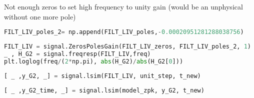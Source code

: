
\noindent Not enough zeros to set high frequency to unity gain (would be an unphysical without one more pole)

\begin{spacing}{1.2} \begin{lstlisting}[frame=single,language=Python]
FILT_LIV_poles_2= np.append(FILT_LIV_poles,-0.00020951281288038756)
\end{lstlisting} \end{spacing}

\begin{spacing}{1.2} \begin{lstlisting}[frame=single,language=Python]
FILT_LIV = signal.ZerosPolesGain(FILT_LIV_zeros, FILT_LIV_poles_2, 1)
_ , H_G2 = signal.freqresp(FILT_LIV,freq)
plt.loglog(freq/(2*np.pi), abs(H_G2)/abs(H_G2[0]))
\end{lstlisting} \end{spacing}


\begin{spacing}{1.2} \begin{lstlisting}[frame=single,language=Python]
[ _ ,y_G2, _] = signal.lsim(FILT_LIV, unit_step, t_new)
\end{lstlisting} \end{spacing}

\begin{spacing}{1.2} \begin{lstlisting}[frame=single,language=Python]
[ _ ,y_G2_time, _] = signal.lsim(model_zpk, y_G2, t_new)
\end{lstlisting} \end{spacing}


